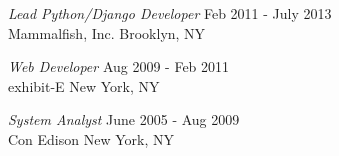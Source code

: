 \documentclass[line,margin]{res}
\begin{document}
\begin{resume}
                {\sl Lead Python/Django Developer} \hfill     Feb 2011 - July 2013 \\
                Mammalfish, Inc.
                Brooklyn, NY

                {\sl Web Developer} \hfill                    Aug 2009 - Feb 2011 \\
                exhibit-E
                New York, NY

                {\sl System Analyst} \hfill                   June 2005 - Aug 2009 \\
                Con Edison
                New York, NY


\end{resume}
\end{document}
